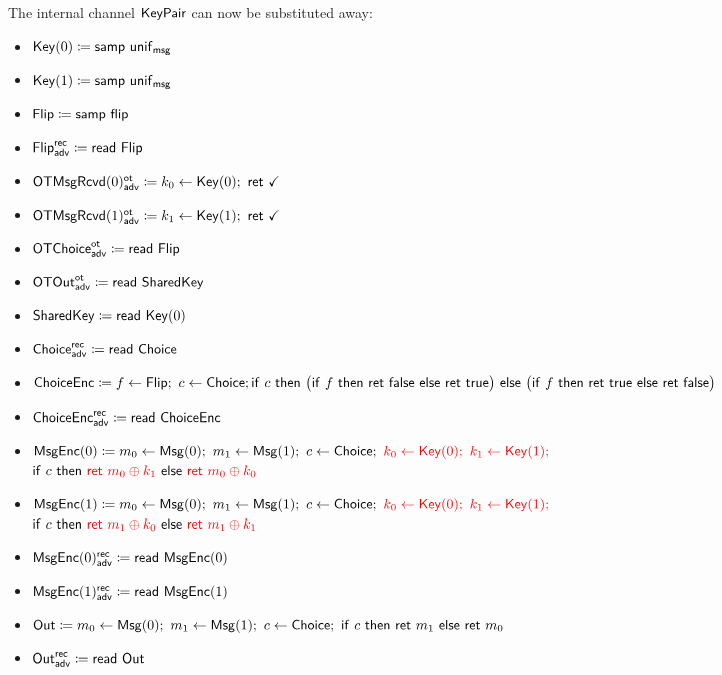 \noindent The internal channel $\mathsf{KeyPair}$ can now be substituted away:

\begin{itemize}
\item $\mathsf{Key}(0) \coloneqq \mathsf{samp} \ \mathsf{unif}_{\mathsf{msg}}$
\item $\mathsf{Key}(1) \coloneqq \mathsf{samp} \ \mathsf{unif}_{\mathsf{msg}}$
\item $\mathsf{Flip} \coloneqq \mathsf{samp} \ \mathsf{flip}$
\item {\color{blue} $\mathsf{Flip}^{\mathsf{rec}}_{\mathsf{adv}} \coloneqq \mathsf{read} \ \mathsf{Flip}$}
\item {\color{blue} $\LeakOTMsgRcvd(0)^\ot_\adv \coloneqq k_0 \leftarrow \Key(0); \ \ret{\checkmark}$}
\item {\color{blue} $\LeakOTMsgRcvd(1)^\ot_\adv \coloneqq k_1 \leftarrow \Key(1); \ \ret{\checkmark}$}
\item {\color{blue} $\mathsf{OTChoice}^{\mathsf{ot}}_{\mathsf{adv}} \coloneqq \mathsf{read} \ \mathsf{Flip}$}
\item {\color{blue} $\mathsf{OTOut}^{\mathsf{ot}}_{\mathsf{adv}} \coloneqq \mathsf{read} \ \mathsf{SharedKey}$}
\item {\color{red} $\mathsf{SharedKey} \coloneqq \mathsf{read} \ \mathsf{Key}(0)$}
\item {\color{blue} $\mathsf{Choice}^{\mathsf{rec}}_{\mathsf{adv}} \coloneqq \mathsf{read} \ \mathsf{Choice}$}
\item $\mathsf{ChoiceEnc} \coloneqq f \leftarrow \mathsf{Flip}; \ c \leftarrow \mathsf{Choice}; \\ \mathsf{if} \ c \ \mathsf{then} \ \big(\mathsf{if} \ f \ \mathsf{then} \ \mathsf{ret} \ \mathsf{false} \ \mathsf{else} \ \mathsf{ret} \ \mathsf{true}\big) \ \mathsf{else} \ \big(\mathsf{if} \ f \ \mathsf{then} \ \mathsf{ret} \ \mathsf{true} \ \mathsf{else} \ \mathsf{ret} \ \mathsf{false}\big)$
\item {\color{blue} $\mathsf{ChoiceEnc}^{\mathsf{rec}}_{\mathsf{adv}} \coloneqq \mathsf{read} \ \mathsf{ChoiceEnc}$}
\item $\MsgEnc(0) \coloneqq m_0 \leftarrow \Msg(0); \ m_1 \leftarrow \Msg(1); \ c \leftarrow \Choice; \ {\color{red} k_0 \leftarrow \Key(0); \ k_1 \leftarrow \Key(1);}$ \\ $\mathsf{if} \ c \ \mathsf{then} \ {\color{red} \mathsf{ret} \ m_0 \oplus k_1} \ \mathsf{else} \ {\color{red} \mathsf{ret} \ m_0 \oplus k_0}$
\item $\MsgEnc(1) \coloneqq m_0 \leftarrow \Msg(0); \ m_1 \leftarrow \Msg(1); \ c \leftarrow \Choice; \ {\color{red} k_0 \leftarrow \Key(0); \ k_1 \leftarrow \Key(1);}$ \\ $\mathsf{if} \ c \ \mathsf{then} \ {\color{red} \mathsf{ret} \ m_1 \oplus k_0} \ \mathsf{else} \ {\color{red} \mathsf{ret} \ m_1 \oplus k_1}$
\item {\color{blue} $\mathsf{MsgEnc}(0)^{\mathsf{rec}}_{\mathsf{adv}} \coloneqq \mathsf{read} \ \mathsf{MsgEnc}(0)$}
\item {\color{blue} $\mathsf{MsgEnc}(1)^{\mathsf{rec}}_{\mathsf{adv}} \coloneqq \mathsf{read} \ \mathsf{MsgEnc}(1)$}
\item $\Out \coloneqq m_0 \leftarrow \Msg(0); \ m_1 \leftarrow \Msg(1); \ c \leftarrow \Choice; \ \ifte{c}{\ret{m_1}}{\ret{m_0}}$
\item {\color{blue} $\mathsf{Out}^{\mathsf{rec}}_{\mathsf{adv}} \coloneqq \mathsf{read} \ \mathsf{Out}$}
\end{itemize}

